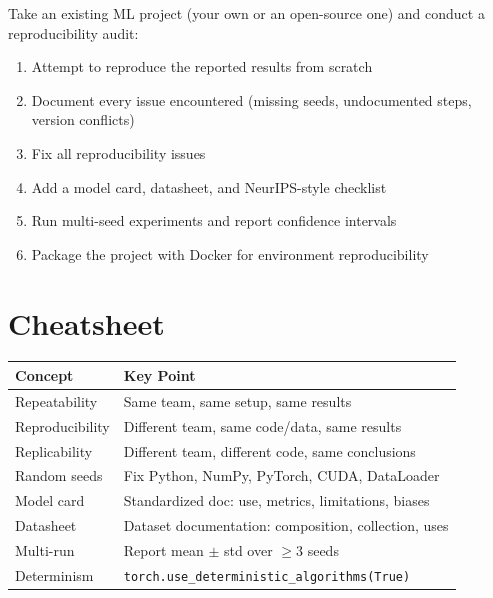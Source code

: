 \begin{exercise}
Take an existing ML project (your own or an open-source one) and
conduct a reproducibility audit:
\begin{enumerate}
  \item Attempt to reproduce the reported results from scratch
  \item Document every issue encountered (missing seeds, undocumented
    steps, version conflicts)
  \item Fix all reproducibility issues
  \item Add a model card, datasheet, and NeurIPS-style checklist
  \item Run multi-seed experiments and report confidence intervals
  \item Package the project with Docker for environment reproducibility
\end{enumerate}
\end{exercise}

\section{Cheatsheet}

\begin{cheatsheet}[title=\textbf{Chapter 11 Summary}]
\begin{tabular}{@{}p{4cm}p{8.5cm}@{}}
\toprule
\textbf{Concept} & \textbf{Key Point} \\
\midrule
Repeatability & Same team, same setup, same results \\
Reproducibility & Different team, same code/data, same results \\
Replicability & Different team, different code, same conclusions \\
Random seeds & Fix Python, NumPy, PyTorch, CUDA, DataLoader \\
Model card & Standardized doc: use, metrics, limitations, biases \\
Datasheet & Dataset documentation: composition, collection, uses \\
Multi-run & Report mean $\pm$ std over $\geq 3$ seeds \\
Determinism & \texttt{torch.use\_deterministic\_algorithms(True)} \\
\bottomrule
\end{tabular}
\end{cheatsheet}
